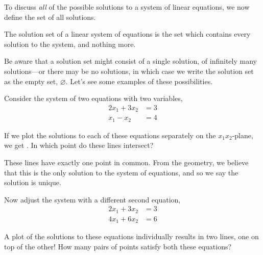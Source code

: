 \documentclass{ximera}
\begin{document}
To discuss \textit{all} of the possible solutions to a system of linear equations, we now define the set of all solutions.

\begin{definition}
The solution set of a linear system of equations is the set which contains every solution to the system, and nothing more.
\end{definition}

Be aware that a solution set might consist of a single solution, of infinitely many solutions---or there may be no solutions, in which case we write the solution set as the empty set, $\varnothing$.  Let's see some examples of these possibilities.

\begin{problem}

  \begin{example}
    Consider the system of two equations with two variables,
    \begin{align*}
      2x_1+3x_2&=3\\
      x_1-x_2&=4
    \end{align*}
    
    If we plot the solutions to each of these equations separately on the
    $x_{1}x_{2}$-plane, we get .  In which point do these lines intersect?
    \begin{multipleChoice}
    \end{multipleChoice}

    \begin{feedback}
      These lines have exactly one point in common.  From the geometry, we believe that this is the only solution to the system of equations, and so we say the solution is unique.
    \end{feedback}
  \end{example}

  \begin{example}
    Now adjust the system with a different second equation,
    \begin{align*}
      2x_1+3x_2&=3\\
      4x_1+6x_2&=6
    \end{align*}

    A plot of the solutions to these equations individually results in two lines, one on top of the other!  How many pairs of points satisfy both these equations?
    \begin{multipleChoice}
    \end{multipleChoice}    
    

\end{example}
\end{problem}
\end{document}
